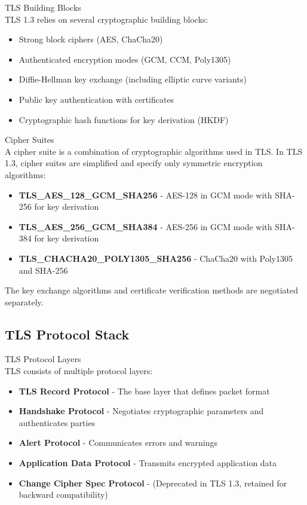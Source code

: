 \begin{concept}{TLS Building Blocks}\\
TLS 1.3 relies on several cryptographic building blocks:
\begin{itemize}
    \item Strong block ciphers (AES, ChaCha20)
    \item Authenticated encryption modes (GCM, CCM, Poly1305)
    \item Diffie-Hellman key exchange (including elliptic curve variants)
    \item Public key authentication with certificates
    \item Cryptographic hash functions for key derivation (HKDF)
\end{itemize}
\end{concept}

\begin{definition}{Cipher Suites}\\
A cipher suite is a combination of cryptographic algorithms used in TLS. In TLS 1.3, cipher suites are simplified and specify only symmetric encryption algorithms:
\begin{itemize}
    \item \textbf{TLS\_AES\_128\_GCM\_SHA256} - AES-128 in GCM mode with SHA-256 for key derivation
    \item \textbf{TLS\_AES\_256\_GCM\_SHA384} - AES-256 in GCM mode with SHA-384 for key derivation
    \item \textbf{TLS\_CHACHA20\_POLY1305\_SHA256} - ChaCha20 with Poly1305 and SHA-256
\end{itemize}
The key exchange algorithms and certificate verification methods are negotiated separately.
\end{definition}

\subsection{TLS Protocol Stack}

\begin{concept}{TLS Protocol Layers}\\
TLS consists of multiple protocol layers:
\begin{itemize}
    \item \textbf{TLS Record Protocol} - The base layer that defines packet format
    \item \textbf{Handshake Protocol} - Negotiates cryptographic parameters and authenticates parties
    \item \textbf{Alert Protocol} - Communicates errors and warnings
    \item \textbf{Application Data Protocol} - Transmits encrypted application data
    \item \textbf{Change Cipher Spec Protocol} - (Deprecated in TLS 1.3, retained for backward compatibility)
\end{itemize}
\end{concept}

